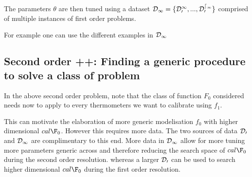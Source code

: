 \begin{bibunit}
{{{{{{  %

  The parameters $\theta$ are then tuned using a dataset $\cal{D}_1 = \{\cal{D}_0^1, ..., \cal{D}_0^{d_1}\}$ comprised of multiple instances of first order problems.

 For example one can use the different examples in  $\cal{D}_1$ 

%
%
  

\subsection{Second order ++: Finding a generic procedure to solve a class of problem}

In the above second order problem, note that the class of function $F_0$ considered needs now to apply to every thermometers we want to calibrate using $f_1$.

  This can motivate the elaboration of more generic modelisation $f_0$ with higher dimensional $cal{\F}_0$.
  However this requires more data.
  The two sources of data $\cal{D}_0$ and $\cal{D}_1$ are complimentary to this end.
  More data in $\cal{D}_1$ allow for more tuning more parameters generic across and therefore reducing the search space of $cal{\F}_0$ during the second order resolution.
  whereas a larger $\cal{D}_0$ can be used to search higher dimensional $cal{\F}_0$ during the first order resolution.

}}}}}}
\end{bibunit}
